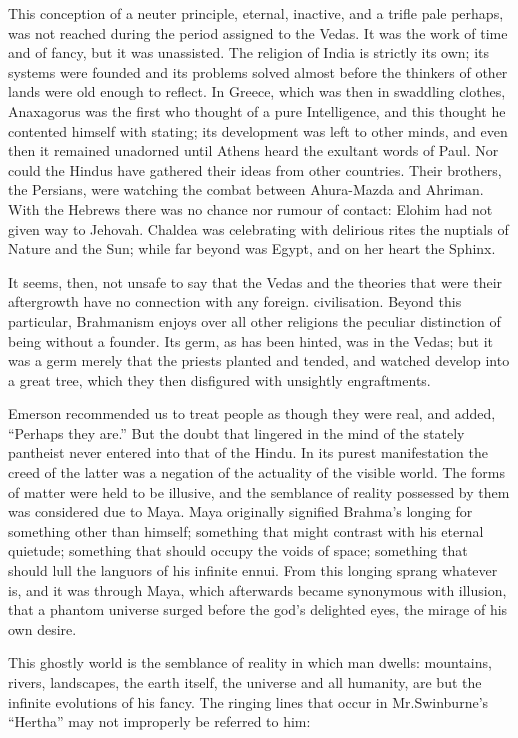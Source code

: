 \documentclass[]{book}
\begin{document}
This conception of a neuter principle, eternal, inactive, and a trifle
pale perhaps, was not reached during the period assigned to the Vedas.
It was the work of time and of fancy, but it was unassisted. The
religion of India is strictly its own; its systems were founded and its
problems solved almost before the thinkers of other lands were old
enough to reflect. In Greece, which was then in swaddling clothes,
Anaxagorus was the first who thought of a pure Intelligence, and this
thought he contented himself with stating; its development was left to
other minds, and even then it remained unadorned until Athens heard the
exultant words of Paul. Nor could the Hindus have gathered their ideas
from other countries. Their brothers, the Persians, were watching the
combat between Ahura-Mazda and Ahriman. With the Hebrews there was no
chance nor rumour of contact: Elohim had not given way to Jehovah.
Chaldea was celebrating with delirious rites the nuptials of Nature and
the Sun; while far beyond was Egypt, and on her heart the Sphinx.

It seems, then, not unsafe to say that the Vedas and the theories that
were their aftergrowth have no connection with any foreign.
civilisation. Beyond this particular, Brahmanism enjoys over all other
religions the peculiar distinction of being without a founder. Its germ,
as has been hinted, was in the Vedas; but it was a germ merely that the
priests planted and tended, and watched develop into a great tree, which
they then disfigured with unsightly engraftments.

Emerson recommended us to treat people as though they were real, and
added, ``Perhaps they are.'' But the doubt that lingered in the mind of
the stately pantheist never entered into that of the Hindu. In its
purest manifestation the creed of the latter was a negation of the
actuality of the visible world. The forms of matter were held to be
illusive, and the semblance of reality possessed by them was considered
due to Maya. Maya originally signified Brahma's longing for something
other than himself; something that might contrast with his eternal
quietude; something that should occupy the voids of space; something
that should lull the languors of his infinite ennui. From this longing
sprang whatever is, and it was through Maya, which afterwards became
synonymous with illusion, that a phantom universe surged before the
god's delighted eyes, the mirage of his own desire.

This ghostly world is the semblance of reality in which man dwells:
mountains, rivers, landscapes, the earth itself, the universe and all
humanity, are but the infinite evolutions of his fancy. The ringing
lines that occur in Mr.Swinburne's ``Hertha'' may not improperly be
referred to him:
\end{document}
